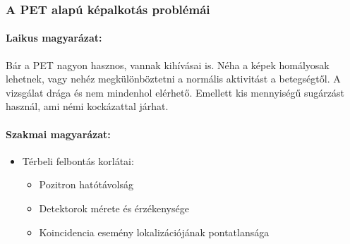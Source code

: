 \documentclass[a4paper,12pt]{article}
\begin{document}
\subsubsection{A PET alapú képalkotás problémái}

\paragraph{Laikus magyarázat:} Bár a PET nagyon hasznos, vannak kihívásai is. Néha a képek homályosak lehetnek, vagy nehéz megkülönböztetni a normális aktivitást a betegségtől. A vizsgálat drága és nem mindenhol elérhető. Emellett kis mennyiségű sugárzást használ, ami némi kockázattal járhat.

\paragraph{Szakmai magyarázat:} \begin{itemize} \item Térbeli felbontás korlátai: \begin{itemize} \item Pozitron hatótávolság \item Detektorok mérete és érzékenysége \item Koincidencia esemény lokalizációjának pontatlansága \end{itemize}


\end{itemize}
\end{document}
